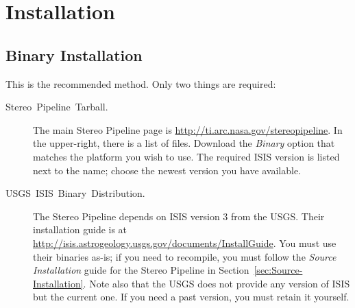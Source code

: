 \chapter{Installation}

\section{Binary Installation}

This is the recommended method. Only two things are required:

\begin{description}
\item [{Stereo~Pipeline~Tarball.}] The main Stereo Pipeline page is \url{http://ti.arc.nasa.gov/stereopipeline}.
In the upper-right, there is a list of files. Download the \emph{Binary}
option that matches the platform you wish to use. The required \ac{ISIS}
version is listed next to the name; choose the newest version you
have available.

\item [{USGS~ISIS~Binary~Distribution.}] The Stereo Pipeline depends
on \ac{ISIS} version 3 from the \ac{USGS}\@. Their installation guide is at \url{http://isis.astrogeology.usgs.gov/documents/InstallGuide}.
You must use their binaries as-is; if you need to recompile, you must
follow the \emph{Source Installation} guide for the Stereo Pipeline in Section~\ref{sec:Source-Installation}.
Note also that the \ac{USGS} does not provide any version of \ac{ISIS} but the
current one. If you need a past version, you must retain it yourself.
\end{description}

